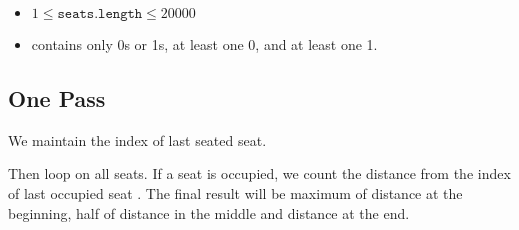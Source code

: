 \begin{itemize}
\item $1 \leq \texttt{seats.length} \leq 20000$
\item {} contains only 0s or 1s, at least one 0, and at least one 1.
\end{itemize}

\subsection{One Pass}
We maintain the index of last seated seat.

Then loop on all seats. If a seat is occupied, we count the distance from the index of last occupied seat
.
The final result will be maximum of distance at the beginning, half of distance in the middle and distance at the end.

\setcounter{lstlisting}{0}
